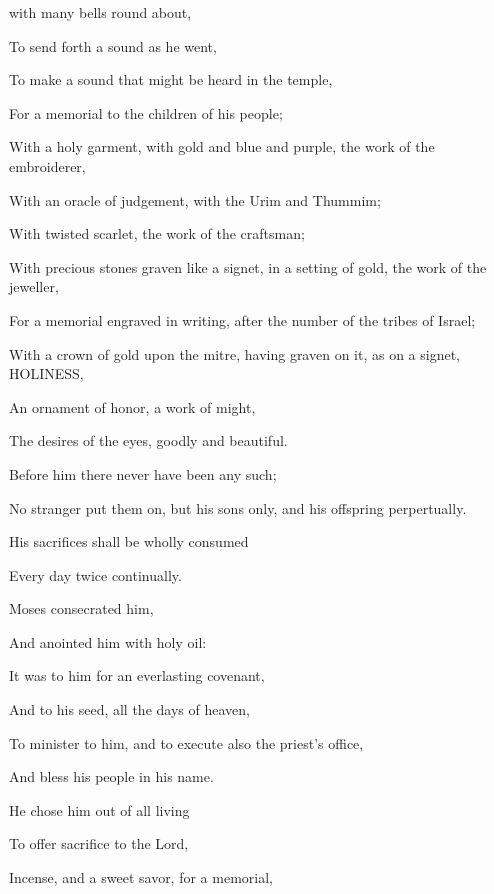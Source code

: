 {\par }{ with many bells round about,
\par }{\Q To send forth a sound as he went,
\par }{\Q To make a sound that might be heard in the temple,
\par }{\Q For a memorial to the children of his people;
\par }{\Q {}With a holy garment, with gold and blue and purple, the work of the embroiderer,
\par }{\Q With an oracle of judgement,
{} with the Urim and Thummim;
\par }{\Q {}With twisted scarlet, the work of the craftsman;
\par }{\Q With precious stones graven like a signet, in a setting of gold, the work of the jeweller,
\par }{\Q For a memorial engraved in writing, after the number of the tribes of Israel;
\par }{\Q {}With a crown of gold upon the mitre,
 having graven on it, as on a signet, HOLINESS,
\par }{\Q An ornament of honor, a work of might,
\par }{\Q The desires of the eyes, goodly and beautiful.
\par }{\Q {}Before him there never have been any such;
\par }{\Q No stranger put them on, but his sons only, and his offspring perpertually.
\par }{\Q {}His sacrifices shall be wholly consumed
\par }{\Q Every day twice continually.
\par }{\Q {}Moses
 consecrated him,
\par }{\Q And anointed him with holy oil:
\par }{\Q It was to him for an everlasting covenant,
\par }{\Q And to his seed, all the days of heaven,
\par }{\Q To minister to him, and to execute also the priest’s office,
\par }{\Q And bless his people in his name.
\par }{\Q {}He chose him out of all living
\par }{\Q To offer sacrifice to the Lord,
\par }{\Q Incense, and a sweet savor, for a memorial,
}
